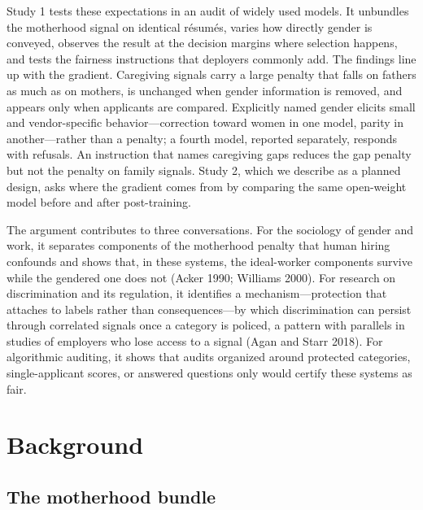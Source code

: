 \documentclass[11pt]{article}
\begin{document}
Study 1 tests these expectations in an audit of widely used models. It
unbundles the motherhood signal on identical résumés, varies how
directly gender is conveyed, observes the result at the decision margins
where selection happens, and tests the fairness instructions that
deployers commonly add. The findings line up with the gradient.
Caregiving signals carry a large penalty that falls on fathers as much
as on mothers, is unchanged when gender information is removed, and
appears only when applicants are compared. Explicitly named gender
elicits small and vendor-specific behavior---correction toward women in
one model, parity in another---rather than a penalty; a fourth model,
reported separately, responds with refusals. An instruction that names
caregiving gaps reduces the gap penalty but not the penalty on family
signals. Study 2, which we describe as a planned design, asks where the
gradient comes from by comparing the same open-weight model before and
after post-training.

The argument contributes to three conversations. For the sociology of
gender and work, it separates components of the motherhood penalty that
human hiring confounds and shows that, in these systems, the
ideal-worker components survive while the gendered one does not (Acker
1990; Williams 2000). For research on discrimination and its regulation,
it identifies a mechanism---protection that attaches to labels rather
than consequences---by which discrimination can persist through
correlated signals once a category is policed, a pattern with parallels
in studies of employers who lose access to a signal (Agan and Starr
2018). For algorithmic auditing, it shows that audits organized around
protected categories, single-applicant scores, or answered questions
only would certify these systems as fair.

\hypertarget{background}{%
\section{Background}\label{background}}

\hypertarget{the-motherhood-bundle}{%
\subsection{The motherhood bundle}\label{the-motherhood-bundle}}
\end{document}

